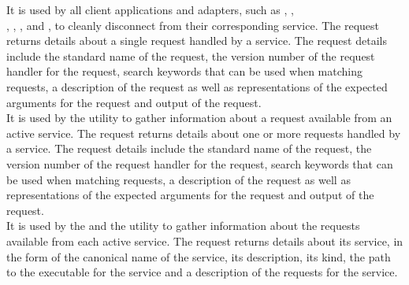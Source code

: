 It is used by all client applications and adapters, such as
,
,\\
, ,
,
 and
, to cleanly disconnect from their
corresponding service.
The  request returns details about a single request
handled by a service.
The request details include the standard name of the request, the version number of the
request handler for the request, search keywords that can be used when matching requests,
a description of the request as well as representations of the expected arguments for the
request and output of the request.\\

It is used by the  utility to gather information about a
request available from an active service.
The  request returns details about one or more requests
handled by a service.
The request details include the standard name of the request, the version number of the
request handler for the request, search keywords that can be used when matching requests,
a description of the request as well as representations of the expected arguments for the
request and output of the request.\\

It is used by the  and the
 utility to gather information about the requests available
from each active service.
The  request returns details about its service, in the
form of the canonical name of the service, its description, its kind, the path to the
executable for the service and a description of the requests for the service.\\

